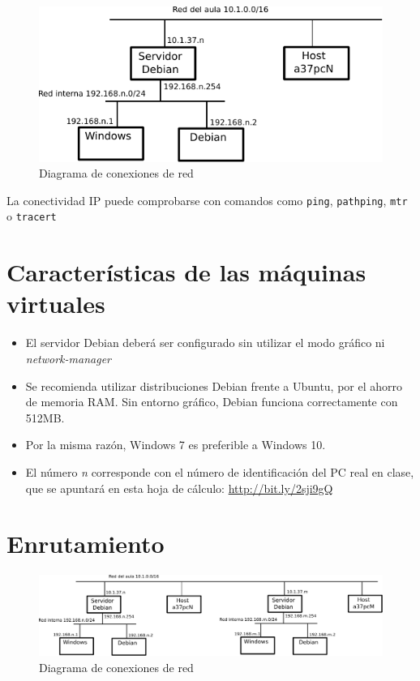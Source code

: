 \begin{figure}[h]
  \center\includegraphics{media/practica-red-ip.pdf}
  \caption{Diagrama de conexiones de red}
  \label{fig:redesip}
\end{figure}

La conectividad IP puede comprobarse con comandos como \texttt{ping}, \texttt{pathping}, \texttt{mtr} o \texttt{tracert}


\section{Características de las máquinas virtuales}
\begin{itemize}
\item El servidor Debian deberá ser configurado sin utilizar el modo gráfico ni \textit{network-manager}
\item Se recomienda utilizar distribuciones Debian frente a Ubuntu, por el ahorro de memoria RAM. Sin entorno gráfico, Debian funciona correctamente con 512MB.
\item Por la misma razón, Windows 7 es preferible a Windows 10.
  
\item El número \textit{n} corresponde con el número de identificación del PC real en clase, que se apuntará en esta hoja de cálculo: \url{http://bit.ly/2sji9gQ}
\end{itemize}


\section{Enrutamiento}
\begin{figure}[h]
  \center\includegraphics[width=\textwidth]{media/practica-enrutamiento-ip.pdf}
  \caption{Diagrama de conexiones de red}
  \label{fig:redesip}
\end{figure}

